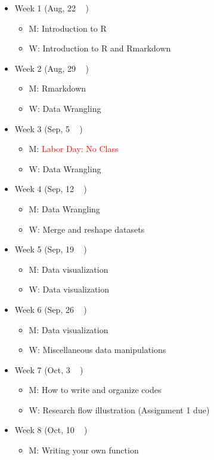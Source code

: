 \documentclass[12pt]{article}
\begin{document}
\begin{itemize}
  \item Week 1 (Aug, 22 ~ )
  \begin{itemize}
    \item M: Introduction to R
    \item W: Introduction to R and Rmarkdown
  \end{itemize}
  \item Week 2 (Aug, 29 ~ )
  \begin{itemize}
    \item M: Rmarkdown
    \item W: Data Wrangling
  \end{itemize}
  \item Week 3 (Sep, 5 ~ )
  \begin{itemize}
    \item M: \textcolor{red}{Labor Day: No Class}
    \item W: Data Wrangling
  \end{itemize}
  \item Week 4 (Sep, 12 ~ )
  \begin{itemize}
    \item M: Data Wrangling
    \item W: Merge and reshape datasets
  \end{itemize}
  \item Week 5 (Sep, 19 ~ )
  \begin{itemize}
    \item M: Data visualization 
    \item W: Data visualization
  \end{itemize}
  \item Week 6 (Sep, 26 ~ )
  \begin{itemize}
    \item M: Data visualization
    \item W: Miscellaneous data manipulations
  \end{itemize}
  \item Week 7 (Oct, 3 ~ )
  \begin{itemize}
    \item M: How to write and organize codes
    \item W: Research flow illustration (Assignment 1 due)
  \end{itemize}
  \item Week 8 (Oct, 10 ~ )
  \begin{itemize}
    \item M: Writing your own function

\end{itemize}
\end{itemize}
\end{document}

